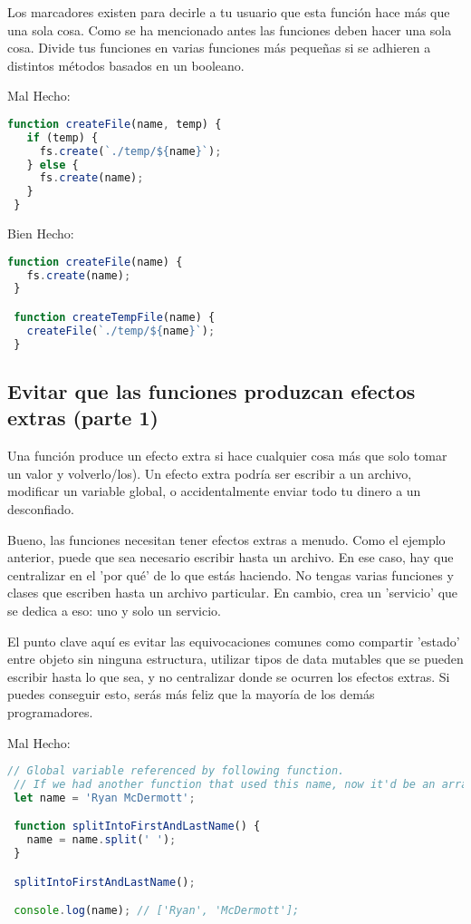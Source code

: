 Los marcadores existen para decirle a tu usuario que esta función hace más que una sola cosa. Como se ha mencionado antes las funciones deben hacer una sola cosa. Divide tus funciones en varias funciones más pequeñas si se adhieren a distintos métodos basados en un booleano.


Mal Hecho:
\begin{lstlisting}[language=TypeScript, style=badstyle]
 function createFile(name, temp) {
   if (temp) {
     fs.create(`./temp/${name}`);
   } else {
     fs.create(name);
   }
 }
\end{lstlisting}
\vspace{0.5cm} %

Bien Hecho:
\begin{lstlisting}[language=TypeScript, style=goodstyle]
 function createFile(name) {
   fs.create(name);
 }

 function createTempFile(name) {
   createFile(`./temp/${name}`);
 }
\end{lstlisting}

\subsection*{Evitar que las funciones produzcan efectos extras (parte 1)}

Una función produce un efecto extra si hace cualquier cosa más que solo tomar un valor y volverlo/los). Un efecto extra podría ser escribir a un archivo, modificar un variable global, o accidentalmente enviar todo tu dinero a un desconfiado.

Bueno, las funciones necesitan tener efectos extras a menudo. Como el ejemplo anterior, puede que sea necesario escribir hasta un archivo. En ese caso, hay que centralizar en el 'por qué' de lo que estás haciendo. No tengas varias funciones y clases que escriben hasta un archivo particular. En cambio, crea un 'servicio' que se dedica a eso: uno y solo un servicio.

El punto clave aquí es evitar las equivocaciones comunes como compartir 'estado' entre objeto sin ninguna estructura, utilizar tipos de data mutables que se pueden escribir hasta lo que sea, y no centralizar donde se ocurren los efectos extras. Si puedes conseguir esto, serás más feliz que la mayoría de los demás programadores.

Mal Hecho:
\begin{lstlisting}[language=TypeScript, style=badstyle]
 // Global variable referenced by following function.
 // If we had another function that used this name, now it'd be an array and it could break it.
 let name = 'Ryan McDermott';

 function splitIntoFirstAndLastName() {
   name = name.split(' ');
 }

 splitIntoFirstAndLastName();

 console.log(name); // ['Ryan', 'McDermott'];
\end{lstlisting}
\vspace{0.5cm} %

